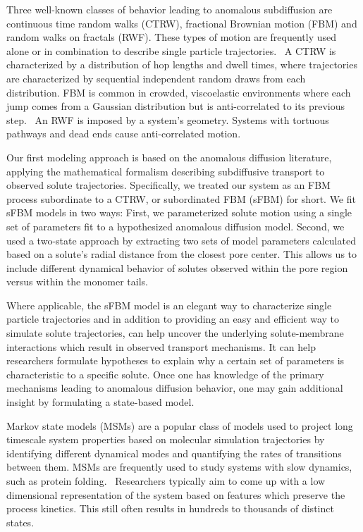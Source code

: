 \documentclass[12pt]{article}
\begin{document}
  Three well-known classes of behavior leading to anomalous subdiffusion are 
  continuous time random walks (CTRW), fractional Brownian motion
  (FBM) and random walks on fractals (RWF).\cite{meroz_toolbox_2015}
  These types of motion are frequently used alone or in combination to describe
  single particle trajectories.~\cite{morrin_three_2018,metzler_anomalous_2014}
  A CTRW is characterized by a distribution of hop lengths and dwell times, 
  where trajectories are characterized by sequential independent random draws from 
  each distribution.\cite{montroll_random_1965} FBM is common in crowded,
  viscoelastic environments where each jump comes from a Gaussian distribution
  but is anti-correlated to its previous step.~\cite{mandelbrot_fractional_1968,jeon_fractional_2010,banks_anomalous_2005}
  An RWF is imposed by a system's geometry. Systems with tortuous pathways 
  and dead ends cause anti-correlated motion.\cite{meroz_toolbox_2015,neusius_subdiffusion_2008}

  Our first modeling approach is based on the anomalous diffusion literature, 
  applying the mathematical formalism describing subdiffusive transport to observed
  solute trajectories. Specifically, we treated our system as an FBM process subordinate
  to a CTRW, or subordinated FBM (sFBM) for short. We fit sFBM
  models in two ways: First, we parameterized solute motion using a single set of parameters fit
  to a hypothesized anomalous diffusion model. Second, we used a two-state approach
  by extracting two sets of model parameters calculated based on a solute's radial
  distance from the closest pore center. This allows us to include different dynamical
  behavior of solutes observed within the pore region versus within the monomer tails.
  
  Where applicable, the sFBM model is an elegant way to characterize single 
  particle trajectories and in addition to providing an easy and efficient way to 
  simulate solute trajectories, can help uncover the underlying solute-membrane
  interactions which result in observed transport mechanisms. It can help 
  researchers formulate hypotheses to explain why a certain set of parameters is
  characteristic to a specific solute. Once one has knowledge of the primary 
  mechanisms leading to anomalous diffusion behavior, one may gain additional
  insight by formulating a state-based model.

  Markov state models (MSMs) are a popular class of models used to project long timescale
  system properties based on molecular simulation trajectories by identifying
  different dynamical modes and quantifying the rates of transitions between them.
  MSMs are frequently used to study systems with slow dynamics, such as protein 
  folding.~\cite{snow_how_2005,chodera_automatic_2007} Researchers typically aim to 
  come up with a low dimensional representation of the system based on features 
  which preserve the process kinetics. This still often results in hundreds to thousands
  of distinct states.~\cite{chodera_markov_2014}
\end{document}
